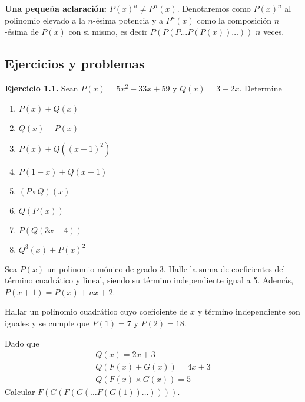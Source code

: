 \textbf{Una pequeña aclaración:} $P(x)^n \neq P^n(x)$. Denotaremos como $P(x)^n$ al polinomio elevado a la $n$-ésima potencia y a $P^n(x)$ como la composición $n$-ésima de $P(x)$ con si mismo, es decir $P(P(P\dots P(P(x))\dots))$ $n$ veces.


\subsection{Ejercicios y problemas}

\textbf{Ejercicio 1.1.} Sean $P(x) = 5x^2 - 33x + 59$ y $Q(x) = 3 - 2x$. Determine
\begin{multicols}{2}
    \begin{enumerate}
        \item $P(x) + Q(x)$
        \item $Q(x) - P(x)$
        \item $P(x) + Q((x+1)^2)$
        \item $P(1-x) + Q(x-1)$
        \item $(P\circ Q)(x)$
        \item $Q(P(x))$
        \item $P(Q(3x - 4))$
        \item $Q^3(x) + P(x)^2$
    \end{enumerate}
\end{multicols}

\begin{section-problem}
    Sea $P(x)$ un polinomio mónico de grado 3. Halle la suma de coeficientes del término cuadrático y lineal, siendo su término independiente igual a 5. Además, $P(x + 1) = P(x) + nx + 2$.
\end{section-problem}

\begin{section-problem}
    Hallar un polinomio cuadrático cuyo coeficiente de $x$ y término independiente son iguales y se cumple que $P(1) = 7$ y $P(2) = 18$.
\end{section-problem}

\begin{section-problem}
    Dado que
        \begin{gather*}
            Q(x) = 2x + 3 \\
            Q( F(x) + G(x) ) = 4x + 3 \\
            Q( F(x) \times G(x) ) = 5
        \end{gather*}
    Calcular $F(G(F(G(\dots F(G(1))\dots))))$.
\end{section-problem}